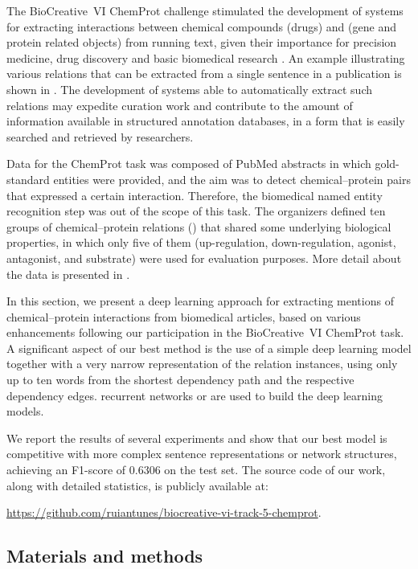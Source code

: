 The BioCreative~VI ChemProt challenge stimulated the development of systems for extracting interactions between chemical compounds (drugs) and  (gene and protein related objects) from running text, given their importance for precision medicine, drug discovery and basic biomedical research \parencite{krallinger2017a}.
An example illustrating various relations that can be extracted from a single sentence in a publication is shown in .
The development of systems able to automatically extract such relations may expedite curation work and contribute to the amount of information available in structured annotation databases, in a form that is easily searched and retrieved by researchers.



Data for the ChemProt task was composed of PubMed abstracts in which gold-standard entities were provided, and the aim was to detect chemical--protein pairs that expressed a certain interaction.
Therefore, the biomedical named entity recognition step was out of the scope of this task.
The organizers defined ten groups of chemical--protein relations () that shared some underlying biological properties, in which only five of them (up-regulation, down-regulation, agonist, antagonist, and substrate) were used for evaluation purposes.
More detail about the data is presented in .

In this section, we present a deep learning approach for extracting mentions of chemical--protein interactions from biomedical articles, based on various enhancements following our participation in the BioCreative~VI ChemProt task.
A significant aspect of our best method is the use of a simple deep learning model together with a very narrow representation of the relation instances, using only up to ten words from the shortest dependency path and the respective dependency edges.
 recurrent networks or  are used to build the deep learning models.

We report the results of several experiments and show that our best model is competitive with more complex sentence representations or network structures, achieving an F1-score of 0.6306 on the test set.
The source code of our work, along with detailed statistics, is publicly available at:

\centerline{\url{https://github.com/ruiantunes/biocreative-vi-track-5-chemprot}.}


\subsection{Materials and methods}
\label{c5:ss:materials}

